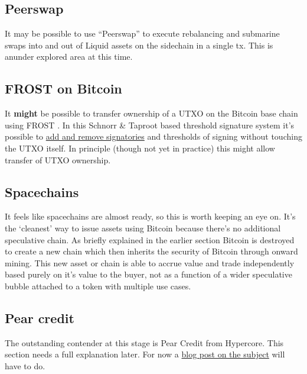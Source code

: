 \subsection{Peerswap}
It may be possible to use ``Peerswap'' to execute rebalancing and submarine swaps into and out of Liquid assets on the sidechain in a single tx. This is anunder explored area at this time.
\subsection{FROST on Bitcoin}
It \textbf{might} be possible to transfer ownership of a UTXO on the Bitcoin base chain using FROST \cite{komlo2020frost}. In this Schnorr \& Taproot based threshold signature system it's possible to \href{https://btctranscripts.com/sydney-bitcoin-meetup/2022-03-29-socratic-seminar/}{add and remove signatories} and thresholds of signing without touching the UTXO itself. In principle (though not yet in practice) this might allow transfer of UTXO ownership. 
\subsection{Spacechains}
It feels like spacechains are almost ready, so this is worth keeping an eye on. It's the `cleanest' way to issue assets using Bitcoin because there's no additional speculative chain. As briefly explained in the earlier section Bitcoin is destroyed to create a new chain which then inherits the security of Bitcoin through onward mining. This new asset or chain is able to accrue value and trade independently based purely on it's value to the buyer, not as a function of a wider speculative bubble attached to a token with multiple use cases.
\subsection{Pear credit}
The outstanding contender at this stage is Pear Credit from Hypercore. This section needs a full explanation later. For now a \href{https://medium.com/@observer1/tether-announced-the-launch-of-pear-credit-8d4f66ccd97b}{blog post on the subject} will have to do.
